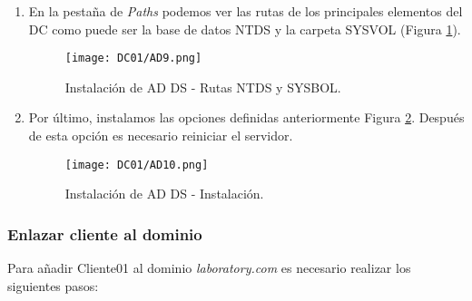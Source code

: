\begin{enumerate}
\item En la pestaña de {\it Paths} podemos ver las rutas de los principales elementos del DC como puede ser la base de datos NTDS y la carpeta SYSVOL (Figura \ref{DC01-AD9}).
\begin{figure}[H] %
\begin{center}
\texttt{[image: DC01/AD9.png]}
\end{center}
\caption{Instalación de AD DS - Rutas NTDS y SYSBOL.}
\label{DC01-AD9}
\end{figure}

\item Por último, instalamos las opciones definidas anteriormente Figura \ref{DC01-AD10}. Después de esta opción es necesario reiniciar el servidor. 
\begin{figure}[H] %
\begin{center}
\texttt{[image: DC01/AD10.png]}
\end{center}
\caption{Instalación de AD DS - Instalación.}
\label{DC01-AD10}
\end{figure}

\end{enumerate}

\subsubsection{Enlazar cliente al dominio}

Para añadir Cliente01 al dominio {\it laboratory.com} es necesario realizar los siguientes pasos: 

